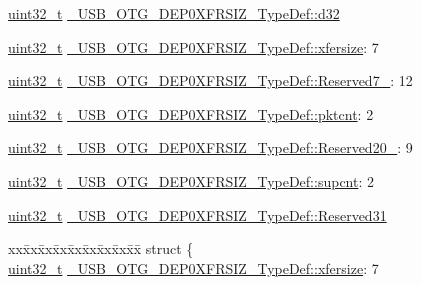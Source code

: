 \begin{DoxyCompactItemize}
\begin{tabbing}
\end{tabbing}\item 
\hyperlink{stdint_8h_a435d1572bf3f880d55459d9805097f62}{uint32\-\_\-t} \hyperlink{group___u_s_b___o_t_g___d_r_i_v_e_r_ga0ee1cacbd541f2985a9648dba956963b}{\-\_\-\-U\-S\-B\-\_\-\-O\-T\-G\-\_\-\-D\-E\-P0\-X\-F\-R\-S\-I\-Z\-\_\-\-Type\-Def\-::d32}
\item 
\hyperlink{stdint_8h_a435d1572bf3f880d55459d9805097f62}{uint32\-\_\-t} \hyperlink{group___u_s_b___o_t_g___d_r_i_v_e_r_gab17c78134e88fbefa976bb6f780c52f4}{\-\_\-\-U\-S\-B\-\_\-\-O\-T\-G\-\_\-\-D\-E\-P0\-X\-F\-R\-S\-I\-Z\-\_\-\-Type\-Def\-::xfersize}\-: 7
\item 
\hyperlink{stdint_8h_a435d1572bf3f880d55459d9805097f62}{uint32\-\_\-t} \hyperlink{group___u_s_b___o_t_g___d_r_i_v_e_r_ga709b318e2fe53d1ccbbb6a274f7cdf9b}{\-\_\-\-U\-S\-B\-\_\-\-O\-T\-G\-\_\-\-D\-E\-P0\-X\-F\-R\-S\-I\-Z\-\_\-\-Type\-Def\-::\-Reserved7\-\_}\-: 12
\item 
\hyperlink{stdint_8h_a435d1572bf3f880d55459d9805097f62}{uint32\-\_\-t} \hyperlink{group___u_s_b___o_t_g___d_r_i_v_e_r_ga903035f15b46865c694e6f28bceb81d6}{\-\_\-\-U\-S\-B\-\_\-\-O\-T\-G\-\_\-\-D\-E\-P0\-X\-F\-R\-S\-I\-Z\-\_\-\-Type\-Def\-::pktcnt}\-: 2
\item 
\hyperlink{stdint_8h_a435d1572bf3f880d55459d9805097f62}{uint32\-\_\-t} \hyperlink{group___u_s_b___o_t_g___d_r_i_v_e_r_ga23f2271c3de7c9cc663775ed61507f29}{\-\_\-\-U\-S\-B\-\_\-\-O\-T\-G\-\_\-\-D\-E\-P0\-X\-F\-R\-S\-I\-Z\-\_\-\-Type\-Def\-::\-Reserved20\-\_}\-: 9
\item 
\hyperlink{stdint_8h_a435d1572bf3f880d55459d9805097f62}{uint32\-\_\-t} \hyperlink{group___u_s_b___o_t_g___d_r_i_v_e_r_ga102cb1f6b08dacfa40ee191b386a42e1}{\-\_\-\-U\-S\-B\-\_\-\-O\-T\-G\-\_\-\-D\-E\-P0\-X\-F\-R\-S\-I\-Z\-\_\-\-Type\-Def\-::supcnt}\-: 2
\item 
\hyperlink{stdint_8h_a435d1572bf3f880d55459d9805097f62}{uint32\-\_\-t} \hyperlink{group___u_s_b___o_t_g___d_r_i_v_e_r_ga6d6ad8f751aee7074cdbce99708c75b6}{\-\_\-\-U\-S\-B\-\_\-\-O\-T\-G\-\_\-\-D\-E\-P0\-X\-F\-R\-S\-I\-Z\-\_\-\-Type\-Def\-::\-Reserved31}
\item 
\begin{tabbing}
xx\=xx\=xx\=xx\=xx\=xx\=xx\=xx\=xx\=\kill
struct \{\\
\>\hyperlink{stdint_8h_a435d1572bf3f880d55459d9805097f62}{uint32\_t} \hyperlink{group___u_s_b___o_t_g___d_r_i_v_e_r_gab17c78134e88fbefa976bb6f780c52f4}{\_USB\_OTG\_DEP0XFRSIZ\_TypeDef::xfersize}: 7\\

\end{tabbing}
\end{DoxyCompactItemize}
